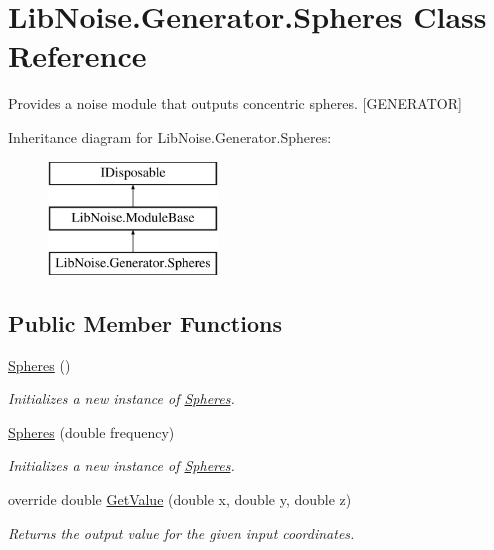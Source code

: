 \hypertarget{class_lib_noise_1_1_generator_1_1_spheres}{}\section{Lib\+Noise.\+Generator.\+Spheres Class Reference}
\label{class_lib_noise_1_1_generator_1_1_spheres}


Provides a noise module that outputs concentric spheres. \mbox{[}G\+E\+N\+E\+R\+A\+T\+OR\mbox{]}  


Inheritance diagram for Lib\+Noise.\+Generator.\+Spheres\+:\begin{figure}[H]
\begin{center}
\leavevmode
\includegraphics[height=3.000000cm]{class_lib_noise_1_1_generator_1_1_spheres}
\end{center}
\end{figure}
\subsection*{Public Member Functions}
\begin{DoxyCompactItemize}
\item 
\hyperlink{class_lib_noise_1_1_generator_1_1_spheres_a520951544132df2120f1c73f552ce66b}{Spheres} ()
\begin{DoxyCompactList}\small\item\em Initializes a new instance of \hyperlink{class_lib_noise_1_1_generator_1_1_spheres}{Spheres}. \end{DoxyCompactList}\item 
\hyperlink{class_lib_noise_1_1_generator_1_1_spheres_a78e8f18da6553721c79eb6666959d958}{Spheres} (double frequency)
\begin{DoxyCompactList}\small\item\em Initializes a new instance of \hyperlink{class_lib_noise_1_1_generator_1_1_spheres}{Spheres}. \end{DoxyCompactList}\item 
override double \hyperlink{class_lib_noise_1_1_generator_1_1_spheres_a320ec44c2f92dd08dcb573e6cc291dc6}{Get\+Value} (double x, double y, double z)
\begin{DoxyCompactList}\small\item\em Returns the output value for the given input coordinates. \end{DoxyCompactList}\end{DoxyCompactItemize}
